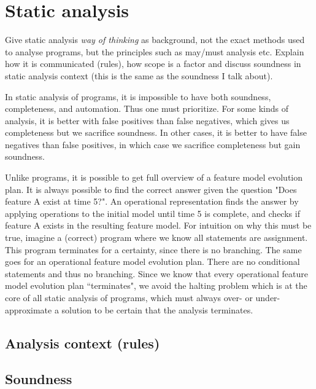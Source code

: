 \section{Static analysis}
\label{sec:static-analysis}

Give static analysis \emph{way of thinking} as background, not the exact methods used to analyse programs, but the principles such as may/must analysis etc. Explain how it is communicated (rules), how scope is a factor and discuss soundness in static analysis context (this is the same as the soundness I talk about). 

In static analysis of programs, it is impossible to have both soundness, completeness, and automation. Thus one must prioritize. For some kinds of analysis, it is better with false positives than false negatives, which gives us completeness but we sacrifice soundness. In other cases, it is better to have false negatives than false positives, in which case we sacrifice completeness but gain soundness.

Unlike programs, it is possible to get full overview of a feature model evolution plan. It is always possible to find the correct answer given the question "Does feature A exist at time 5?". An operational representation finds the answer by applying operations to the initial model until time 5 is complete, and checks if feature A exists in the resulting feature model. For intuition on why this must be true, imagine a (correct) program where we know all statements are assignment. This program terminates for a certainty, since there is no branching. The same goes for an operational feature model evolution plan. There are no conditional statements and thus no branching. Since we know that every operational feature model evolution plan ``terminates", we avoid the halting problem which is at the core of all static analysis of programs, which must always over- or under-approximate a solution to be certain that the analysis terminates.

\subsection{Analysis context (rules)}
\label{sub:analysis-context}
\subsection{Soundness}
